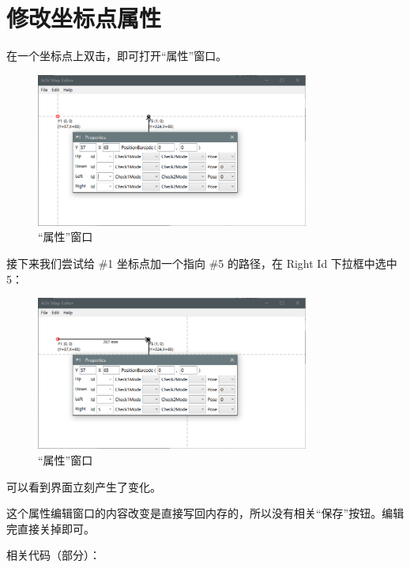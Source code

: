 \section{修改坐标点属性}

在一个坐标点上双击，即可打开``属性''窗口。

\begin{figure}[H]
  \centering
  \includegraphics[width=0.8\textwidth]{assets/prop.png}
  \caption{``属性''窗口}
  \label{fig:prop}
\end{figure}

接下来我们尝试给 \#1 坐标点加一个指向 \#5 的路径，在 Right Id 下拉框中选中 5：

\begin{figure}[H]
  \centering
  \includegraphics[width=0.8\textwidth]{assets/prop2.png}
  \caption{``属性''窗口}
  \label{fig:prop2}
\end{figure}

可以看到界面立刻产生了变化。

这个属性编辑窗口的内容改变是直接写回内存的，所以没有相关``保存''按钮。编辑完直接关掉即可。

相关代码（部分）：

